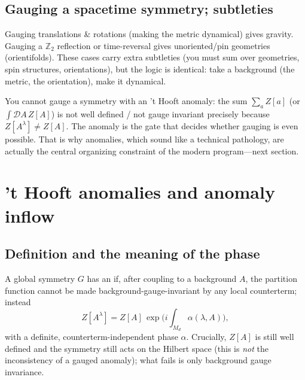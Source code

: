 \documentclass[11pt]{article}
\newcommand{\Ztwo}{\mathbb{Z}_2}
\begin{document}
\subsection{Gauging a spacetime symmetry; subtleties}

\begin{eexample}
Gauging translations \& rotations (making the metric dynamical) gives gravity. Gauging
a $\Ztwo$ reflection or time-reversal gives unoriented/pin geometries (orientifolds).
These cases carry extra subtleties (you must sum over geometries, spin structures,
orientations), but the logic is identical: take a background (the metric, the
orientation), make it dynamical.
\end{eexample}

\begin{nnote}
You cannot gauge a symmetry with an 't Hooft anomaly: the sum $\sum_a Z[a]$ (or
$\int\mathcal D A\,Z[A]$) is not well defined / not gauge invariant precisely because
$Z[A^\lambda]\neq Z[A]$. The anomaly is the gate that decides whether gauging is even
possible. That is why anomalies, which sound like a technical pathology, are actually
the central organizing constraint of the modern program---next section.
\end{nnote}

\section{'t Hooft anomalies and anomaly inflow}

\subsection{Definition and the meaning of the phase}

\begin{ddefinition}
A global symmetry $G$ has an  if, after coupling to a background
$A$, the partition function cannot be made background-gauge-invariant by any local
counterterm; instead
\[
Z[A^\lambda] = Z[A]\,\exp\!\Big(i\!\int_{M_d}\!\alpha(\lambda,A)\Big),
\]
with a definite, counterterm-independent phase $\alpha$. Crucially, $Z[A]$ is still
well defined and the symmetry still acts on the Hilbert space (this is \emph{not} the
inconsistency of a gauged anomaly); what fails is only background gauge invariance.
\end{ddefinition}
\end{document}
